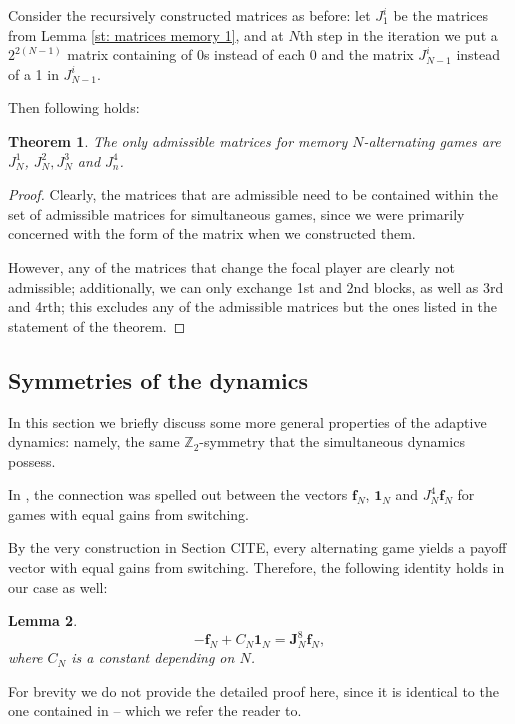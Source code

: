 \documentclass{article}
\newtheorem{theorem}{Theorem}[section]
\newtheorem{lemma}[theorem]{Lemma}
\theoremstyle{definition}
\numberwithin{equation}{section}
\begin{document}
    Consider the recursively constructed matrices as before: let $J^i_1$ be the matrices from Lemma \ref{st: matrices memory 1}, and at $N$th step  in the iteration we put a $2^{2(N-1)}$ matrix containing of $0$s instead of each $0$ and the matrix $J^i_{N-1}$ instead of a 1 in $J^i_{N-1}$. 


Then following holds:
\begin{theorem}
    The only admissible matrices for memory $N$-alternating games are $J^1_N$, $J^2_N,  J^3_N$ and $J^4_n$. 
\end{theorem}
\begin{proof}
    Clearly, the matrices that are admissible need to be contained within the set of admissible matrices for simultaneous games, since we were primarily concerned with the form of the matrix when we constructed them. 

    However, any of the matrices that change the focal player are clearly not admissible; additionally, we can only exchange 1st and 2nd blocks, as well as 3rd and 4rth; this excludes any of the admissible matrices but the ones listed in the statement of the theorem. 
\end{proof}
\subsection{Symmetries of the dynamics}
\label{sec: symmetries dynamics}
In this section we briefly discuss some more general properties of the adaptive dynamics: namely, the same $\mathbb{Z}_2$-symmetry that the simultaneous dynamics possess. 

In \cite{balabanova2024adaptive}, the connection was spelled out between  the vectors $\mathbf{f}_N$, $\mathbf{1}_N$ and $J_N^4\mathbf{f}_N$ for games with equal gains from switching. 

By the very construction in Section CITE, every alternating game yields a payoff vector with equal gains from switching. Therefore, the following identity holds in our case as well:
\begin{lemma}
    \label{st: multiplication payoff by J}
    \begin{equation}
        -\mathbf{f}_N + C_N\mathbf{1}_N = \mathbf{J}_N^8\mathbf{f}_N,
    \end{equation}
    where $C_N$ is a constant depending on $N$.
\end{lemma}

For brevity we do not provide the detailed proof here, since it is identical to the one contained in \cite{balabanova2024adaptive}-- which we refer the reader to. 
\end{document}
